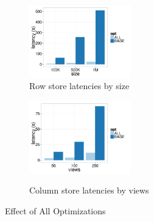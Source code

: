 \begin{figure}[h]
	\centering
	\vspace*{-10pt}
	\begin{subfigure}{0.48\linewidth}
		\centering
		\includegraphics[width=4.4cm] {Images/row_all_none_by_size.pdf}
		\vspace{-10pt}
		\caption{Row store latencies by size}
		\label{fig:row_all_none_size}
	\end{subfigure}
	\begin{subfigure}{0.48\linewidth}
		\centering
		\includegraphics[width=4.4cm] {Images/col_all_none_by_views.pdf}\
		\vspace{-10pt}
		\caption{Column store latencies by views}
		\label{fig:col_all_none_views}
	\end{subfigure}
	\vspace{-10pt}
	\caption{Effect of All Optimizations}
	\label{fig:all_opt}
	\vspace{-15pt}
\end{figure}


